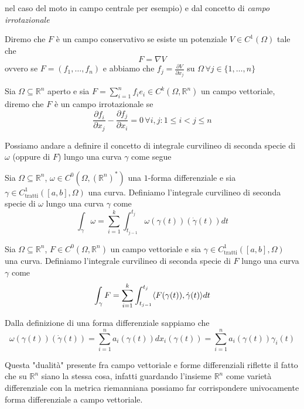 nel caso del moto in campo centrale per esempio) e dal concetto di \emph{campo irrotazionale}
\begin{definition}
	Diremo che $F$ è un campo conservativo se esiste un potenziale $V \in C^1(\Omega)$ tale che
	$$
	F = \nabla V
	$$
	ovvero se $F=(f_1, \ldots, f_n)$ e abbiamo che $f_j = \frac{\partial V}{\partial x_j}$ su $\Omega \, \forall j \in \{1, \ldots, n \}$
\end{definition}
\begin{definition}
	Sia  $\Omega \subseteq \mathbb{R}^n$ aperto e sia $F = \sum_{i=1}^n f_i e_i \in C^k(\Omega, \mathbb{R}^n)$ un campo vettoriale, diremo che $F$ è un campo irrotazionale se
	$$
	\frac{\partial f_i}{\partial x_j} - \frac{\partial f_j}{\partial x_i} = 0 \, \forall i, j: 1 \leq i < j \leq n
	$$
\end{definition}

Possiamo andare a definire il concetto di integrale curvilineo di seconda specie di $\omega$ (oppure di $F$) lungo una curva $\gamma$ come segue
\begin{definition}
	Sia $\Omega \subseteq \mathbb{R}^n$, $\omega \in C^0(\Omega, (\mathbb{R}^n)^*)$ una $1$-forma differenziale e sia $\gamma \in C^1_{\text{tratti}}([a,b], \Omega)$ una curva. Definiamo l'integrale curvilineo di seconda specie di 
	$\omega$ lungo una curva $\gamma$ come
	$$
		\int_\gamma \omega = \sum_{i=1}^k \int_{t_{j-1}}^{t_j} \omega(\gamma(t))(\dot{\gamma}(t))dt
	$$
\end{definition}
\begin{definition}
	Sia $\Omega \subseteq \mathbb{R}^n$, $F \in C^0(\Omega, \mathbb{R}^n)$ un campo vettoriale e sia $\gamma \in C^1_{\text{tratti}}([a, b], \Omega)$ una curva. Definiamo l'integrale curvilineo di seconda specie di 
	$F$ lungo una curva $\gamma$ come 
	$$
		\int_\gamma F = \sum_{i=1}^k \int_{t_{j-1}}^{t_j} \langle F(\gamma(t)), \dot{\gamma}(t) \rangle dt
	$$
\end{definition}
\begin{remark}
Dalla definizione di una forma differenziale sappiamo che
$$
\omega(\gamma(t))(\dot{\gamma}(t)) = \sum_{i=1}^n a_i(\gamma(t))dx_i(\gamma(t)) = \sum_{i=1}^n a_i(\gamma(t))\gamma_i(t) 
$$
\end{remark}

\begin{remark}
Questa "dualità" presente fra campo vettoriale e forme differenziali riflette il fatto che su $\mathbb{R}^n$ siano la stessa cosa, infatti guardando l'insieme $\mathbb{R}^n$ come varietà differenziale con la metrica riemanniana possiamo
far corrispondere univocamente forma differenziale a campo vettoriale.
\end{remark}

